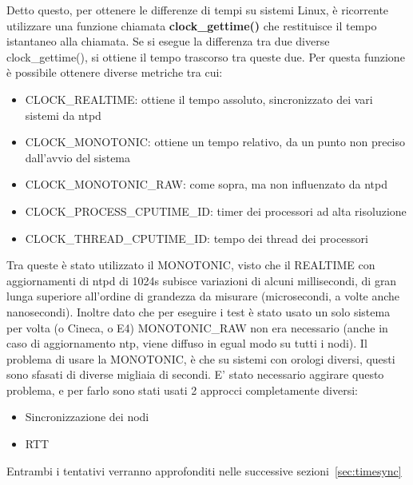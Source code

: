 Detto questo, per ottenere le differenze di tempi su sistemi Linux, è ricorrente utilizzare una funzione chiamata \textbf{clock\_gettime()} che restituisce il tempo istantaneo alla chiamata. Se si esegue la differenza tra due diverse clock\_gettime(), si ottiene il tempo trascorso tra queste due.
Per questa funzione è possibile ottenere diverse metriche tra cui:
\begin{itemize}
    \item CLOCK\_REALTIME: ottiene il tempo assoluto, sincronizzato dei vari sistemi da ntpd
    \item CLOCK\_MONOTONIC: ottiene un tempo relativo, da un punto non preciso dall'avvio del sistema
    \item CLOCK\_MONOTONIC\_RAW: come sopra, ma non influenzato da ntpd
    \item CLOCK\_PROCESS\_CPUTIME\_ID: timer dei processori ad alta risoluzione
    \item CLOCK\_THREAD\_CPUTIME\_ID: tempo dei thread dei processori
\end{itemize}
Tra queste è stato utilizzato il MONOTONIC, visto che il REALTIME con aggiornamenti di ntpd di 1024s subisce variazioni di alcuni millisecondi\cite{ntpd}, di gran lunga superiore all'ordine di grandezza da misurare (microsecondi, a volte anche nanosecondi). Inoltre dato che per eseguire i test è stato usato un solo sistema per volta (o Cineca, o E4) MONOTONIC\_RAW non era necessario (anche in caso di aggiornamento ntp, viene diffuso in egual modo su tutti i nodi).
Il problema di usare la MONOTONIC, è che su sistemi con orologi diversi, questi sono sfasati di diverse migliaia di secondi. E' stato necessario aggirare questo problema, e per farlo sono stati usati 2 approcci completamente diversi:
\begin{itemize}
    \item Sincronizzazione dei nodi
    \item RTT
\end{itemize} 

\noindent Entrambi i tentativi verranno approfonditi nelle successive sezioni~\ref{sec:timesync}


